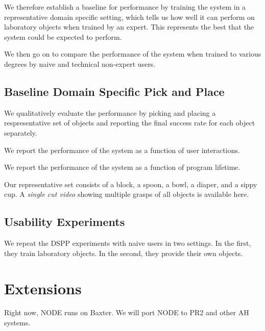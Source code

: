 \documentclass[conference]{IEEEtran}
\begin{document}
We therefore establish a baseline for performance by training the system in a representative domain
specific setting, which tells us how well it can perform on laboratory objects when trained by an 
expert. This represents the best that the system could be expected to perform.

We then go on to compare the performance of the system when trained to various degrees by naive
and technical non-expert users.

\subsection{Baseline Domain Specific Pick and Place}
We qualitatively evaluate the performance by picking and placing
a respresentative set of objects and reporting the final success rate for each 
object separately.

We report the performance of the system as a function of user interactions.

We report the performance of the system as a function of program lifetime.

Our representative set consists of a block, a spoon,
a bowl, a diaper, and a sippy cup. A \emph{single cut video} showing multiple grasps
of all objects is available here.

\subsection{Usability Experiments}
We repeat the DSPP experiments with naive users in two settings. In the first, they train laboratory
objects. In the second, they provide their own objects.


\citep{tellex11}


\section{Extensions}
Right now, NODE runs on Baxter. We will port NODE to PR2 and other AH systems.





\end{document}
